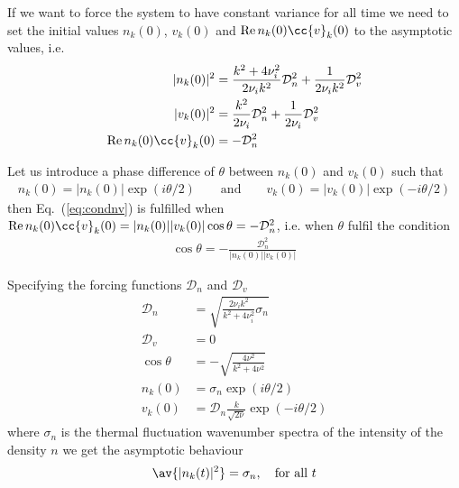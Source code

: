 \documentclass[10pt,a4paper]{article}
\newcommand{\eq}[1]{Eq.~(#1)}
\newcommand{\src}{\ensuremath{\mathcal{D}}}
\begin{document}
If we want to force the system to have constant variance for all time we need to set the initial
values $n_k(0)$, $v_k(0)$ and $\Re n_k(0)\cc{v}_k(0)$ to the asymptotic values, i.e.\
\begin{align}
|n_k(0)|^2 &= \frac{k^2+4\nu_i^2}{2\nu_ik^2}\src_n^2+\frac{1}{2\nu_ik^2}\src_v^2\\
|v_k(0)|^2 &= \frac{k^2}{2\nu_i}\src_n^2+\frac{1}{2\nu_i}\src_v^2\\
\Re n_k(0)\cc{v}_k(0) &= -\src_n^2 \label{eq:condnv}
\end{align}

Let us introduce a phase difference of $\theta$ between  $n_k(0)$ and $v_k(0)$ such that
\begin{align*}
n_k(0) = |n_k(0)|\exp\left( i\theta/2\right)\qquad\mbox{and}\qquad 
v_k(0) = |v_k(0)|\exp\left(-i\theta/2\right)
\end{align*}
then \eq{\ref{eq:condnv}} is fulfilled when 
$\Re n_k(0)\cc{v}_k(0) = |n_k(0)||v_k(0)|\cos\theta = -\src_n^2$, i.e. when $\theta$ fulfil
the condition
\begin{align}
\cos\theta = -\frac{\src_n^2}{|n_k(0)||v_k(0)|}
\end{align}


Specifying the forcing functions $\src_n$ and $\src_v$
\begin{align}
\src_n&=\sqrt{\frac{2\nu_ik^2}{k^2+4\nu_i^2}\sigma_n}\\
\src_v&=0\\
\cos\theta&=-\sqrt{\frac{4\nu^2}{k^2+4\nu^2}}\\
n_k(0) &= \sigma_n\exp(i\theta/2)\\
v_k(0) &= \src_n\frac{k}{\sqrt{2\nu}}\exp(-i\theta/2)
\end{align}
where $\sigma_n$ is the thermal fluctuation wavenumber spectra of the intensity of the
density $n$ we get the asymptotic behaviour
\begin{align}
\av{|n_k(t)|^2} = \sigma_n, \quad \mbox{for all } t
\end{align}
\end{document}
